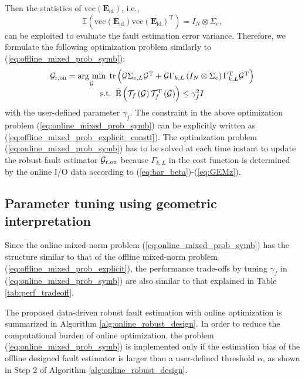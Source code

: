 \documentclass[twocolumn]{autart}
\DeclareMathOperator*{\argmin}{\arg\,\min}
\begin{document}
Then the statistics of $\mathrm{vec} \left( \mathbf{E}_{\mathrm{id}} \right)$, i.e.,
$$\mathbb{E} \left( \mathrm{vec} \left( \mathbf{E}_{\mathrm{id}} \right)  \mathrm{vec} \left( \mathbf{E}_{\mathrm{id}} \right)^\mathrm{T} \right)
= I_N \otimes \Sigma_e,
$$ can be exploited to evaluate the fault estimation error variance.
Therefore, we formulate the following optimization problem similarly to (\ref{eq:offline_mixed_prob_symb}):
\begin{equation}\label{eq:online_mixed_prob_symb}
\begin{array}{c}
\mathcal{G}_{\rm{r,on}} = \argmin\limits_{\mathcal{G}}\; \mathrm{tr}
\left( \mathcal{G} \Sigma_{e,L} \mathcal{G}^\mathrm{T}
 + \mathcal{G} \Gamma_{k,L} \left( I_N \otimes \Sigma_e \right)
 \Gamma_{k,L}^\mathrm{T} \mathcal{G}^\mathrm{T} \right) \\
\mathrm{s.t.}\;\; \mathbb{\bar E} \left( {\mathcal{T}}_{f} \left( \mathcal{G} \right) {\mathcal{T}}_{f}^\text{T} \left( \mathcal{G} \right) \right) \leq \gamma_f^2 I
\end{array}
\end{equation}
with the user-defined parameter $\gamma_f$. The constraint in the above optimization problem (\ref{eq:online_mixed_prob_symb}) can be explicitly written as (\ref{eq:offline_mixed_prob_explicit_constf}).
The optimization problem (\ref{eq:online_mixed_prob_symb}) has to be solved at each time instant to update the robust fault estimator $\mathcal{G}_{\rm{r,on}}$ because $\Gamma_{k,L}$ in the cost function is determined by the online I/O data according to (\ref{eq:bar_beta})-(\ref{eq:GEMz}).


\subsection{Parameter tuning using geometric interpretation}
Since the online mixed-norm problem (\ref{eq:online_mixed_prob_symb}) has the structure similar to that of the offline mixed-norm problem (\ref{eq:offline_mixed_prob_explicit}), the performance trade-offs by tuning $\gamma_f$ in (\ref{eq:online_mixed_prob_symb}) are also similar to that explained in Table \ref{tab:perf_tradeoff}.


The proposed data-driven robust fault estimation with online optimization is summarized in Algorithm \ref{alg:online_robust_design}.
In order to reduce the computational burden of online optimization, the problem (\ref{eq:online_mixed_prob_symb}) is implemented only if the estimation bias of the offline designed fault estimator is larger than a user-defined threshold $\alpha$, as shown in Step 2 of Algorithm \ref{alg:online_robust_design}.
\end{document}
